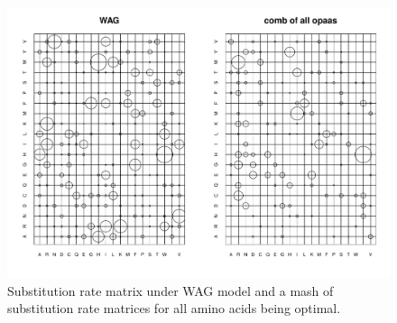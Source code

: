 \documentclass[12pt]{article}
\begin{document}
\begin{figure}[h]
\includegraphics[width=\textwidth]{WAGvsMash.pdf}
\caption{Substitution rate matrix under WAG model and a mash of substitution rate matrices for all amino acids being optimal.}
\label{fig:WAG-Mash}
\end{figure}
\end{document}
